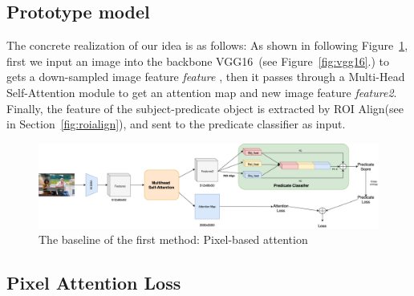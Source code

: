 \subsection{ Prototype model}
The concrete realization of our idea is as follows: As shown in following Figure~\ref{fig:method1baseline}, first we input an image into the  backbone VGG16~\cite{simonyan2015deep}(see Figure~\ref{fig:vgg16}.) to gets a down-sampled image feature \textit{feature} ,  then it passes through a Multi-Head Self-Attention module to get an attention map and new image feature \textit{feature2}. Finally, the feature of the subject-predicate object is extracted by ROI Align(see in Section~\ref{fig:roialign}), and sent to the predicate classifier as input.


\begin{figure}[!htbp]
	\centering
	\includegraphics[width=1\linewidth]{figures/method1_baseline}
	\caption[The baseline of the first method: Pixel-based attention]{The baseline of the  first method: Pixel-based attention}
	\label{fig:method1baseline}
\end{figure}

\subsection{Pixel  Attention Loss}

